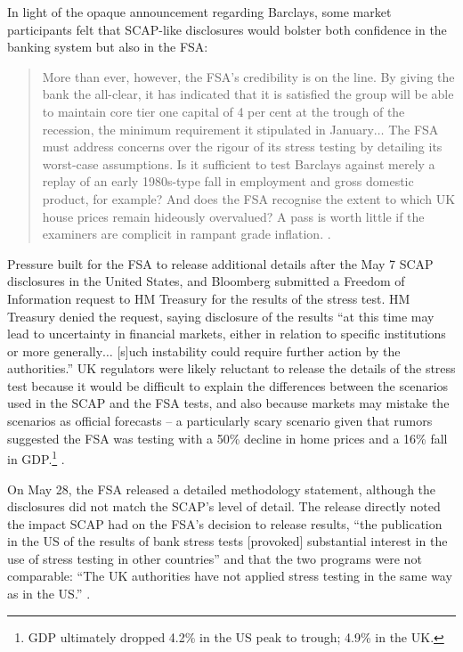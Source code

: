 \documentclass[12pt]{article}
\begin{document}
In light of the opaque announcement regarding Barclays, some market participants felt that SCAP-like disclosures would bolster both confidence in the banking system but also in the FSA:

\begin{quote}
 More than ever, however, the FSA’s credibility is on the line. By giving the bank the all-clear, it has indicated that it is satisfied the group will be able to maintain core tier one capital of 4 per cent at the trough of the recession, the minimum requirement it stipulated in January$\dots$ The FSA must address concerns over the rigour of its stress testing by detailing its worst-case assumptions. Is it sufficient to test Barclays against merely a replay of an early 1980s-type fall in employment and gross domestic product, for example? And does the FSA recognise the extent to which UK house prices remain hideously overvalued? A pass is worth little if the examiners are complicit in rampant grade inflation. \citep{Lex}.
\end{quote}

Pressure built for the FSA to release additional details after the May 7 SCAP disclosures in the United States, and Bloomberg submitted a Freedom of Information request to HM Treasury for the results of the stress test. HM Treasury denied the request, saying disclosure of the results ``at this time may lead to uncertainty in financial markets, either in relation to specific institutions or more generally$\dots$ [s]uch instability could require further action by the authorities.'' UK regulators were likely reluctant to release the details of the stress test because it would be difficult to explain the differences between the scenarios used in the SCAP and the FSA tests, and also because markets may mistake the scenarios as official forecasts -- a particularly scary scenario given that rumors suggested the FSA was testing with a 50\% decline in home prices and a 16\% fall in GDP.\footnote{GDP ultimately dropped 4.2\% in the US peak to trough; 4.9\% in the UK.} \citep{Murphy}.

On May 28, the FSA released a detailed methodology statement, although the disclosures did not match the SCAP's level of detail. The release directly noted the impact SCAP had on the FSA's decision to release results, ``the publication in the US of the results of bank stress tests [provoked] substantial interest in the use of stress testing in other countries'' and that the two programs were not comparable: ``The UK authorities have not applied stress testing in the same way as in the US.'' \citep{Results}.
\end{document}
